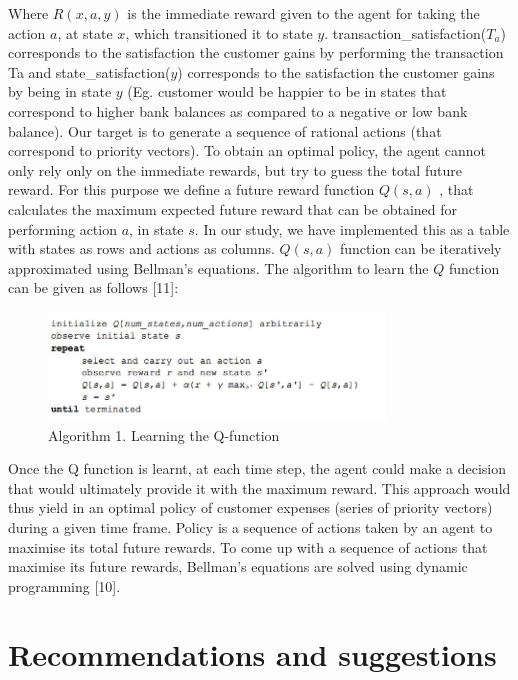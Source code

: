 \documentclass[]{article}
\begin{document}
Where $R(x,a,y)$ is the immediate reward given to the agent for taking the
action $a$, at state $x$, which transitioned it to state $y$.
transaction\_satisfaction($T_a$) corresponds to the satisfaction the
customer gains by performing the transaction Ta and
state\_satisfaction($y$) corresponds to the satisfaction the customer
gains by being in state $y$ (Eg. customer would be happier to be in states
that correspond to higher bank balances as compared to a negative or low
bank balance). Our target is to generate a sequence of rational actions
(that correspond to priority vectors). To obtain an optimal policy, the
agent cannot only rely only on the immediate rewards, but try to guess
the total future reward. For this purpose we define a future reward
function $Q(s,a)$ , that calculates the maximum expected future reward
that can be obtained for performing action $a$, in state $s$. In our study,
we have implemented this as a table with states as rows and actions as
columns. $Q(s,a)$ function can be iteratively approximated using Bellman's
equations. The algorithm to learn the $Q$ function can be given as follows
{[}11{]}:

\begin{figure}
\centering
\includegraphics[width=0.8\textwidth]{uploads/upload_b5ac554de62d373fe50936d37cc4e10d.jpg}
\caption{Algorithm 1. Learning the Q-function}
\end{figure}

Once the Q function is learnt, at each time step, the agent could make a
decision that would ultimately provide it with the maximum reward. This
approach would thus yield in an optimal policy of customer expenses
(series of priority vectors) during a given time frame. Policy is a
sequence of actions taken by an agent to maximise its total future
rewards. To come up with a sequence of actions that maximise its future
rewards, Bellman's equations are solved using dynamic programming
{[}10{]}.

\section{Recommendations and
suggestions}\label{recommendations-and-suggestions}
\end{document}
